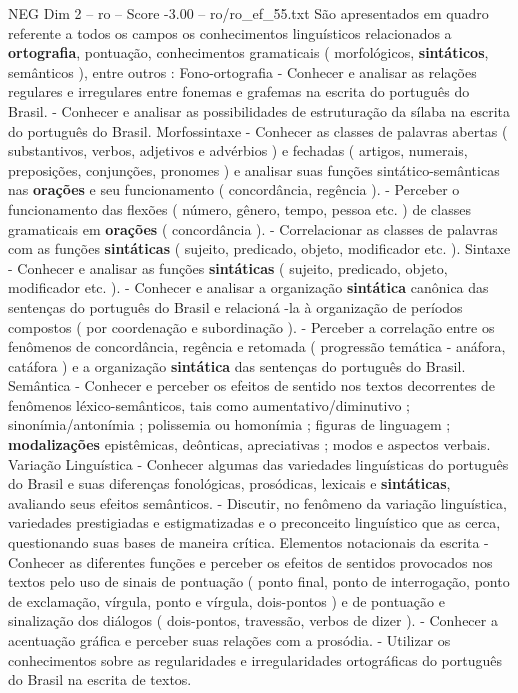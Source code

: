 \begin{textsample}{NEG Dim 2 – ro – Score -3.00 – ro/ro\_ef\_55.txt}
São apresentados em quadro referente a todos os campos os conhecimentos linguísticos relacionados a \textbf{ortografia}, pontuação, conhecimentos gramaticais ( morfológicos, \textbf{sintáticos}, semânticos ), entre outros : Fono-ortografia - Conhecer e analisar as relações regulares e irregulares entre fonemas e grafemas na escrita do português do Brasil. - Conhecer e analisar as possibilidades de estruturação da sílaba na escrita do português do Brasil.
Morfossintaxe - Conhecer as classes de palavras abertas ( substantivos, verbos, adjetivos e advérbios ) e fechadas ( artigos, numerais, preposições, conjunções, pronomes ) e analisar suas funções sintático-semânticas nas \textbf{orações} e seu funcionamento ( concordância, regência ). - Perceber o funcionamento das flexões ( número, gênero, tempo, pessoa etc. ) de classes gramaticais em \textbf{orações} ( concordância ). - Correlacionar as classes de palavras com as funções \textbf{sintáticas} ( sujeito, predicado, objeto, modificador etc. ).
Sintaxe - Conhecer e analisar as funções \textbf{sintáticas} ( sujeito, predicado, objeto, modificador etc. ). - Conhecer e analisar a organização \textbf{sintática} canônica das sentenças do português do Brasil e relacioná -la à organização de períodos compostos ( por coordenação e subordinação ). - Perceber a correlação entre os fenômenos de concordância, regência e retomada ( progressão temática - anáfora, catáfora ) e a organização \textbf{sintática} das sentenças do português do Brasil.
Semântica - Conhecer e perceber os efeitos de sentido nos textos decorrentes de fenômenos léxico-semânticos, tais como aumentativo/diminutivo ; sinonímia/antonímia ; polissemia ou homonímia ; figuras de linguagem ; \textbf{modalizações} epistêmicas, deônticas, apreciativas ; modos e aspectos verbais.
Variação Linguística - Conhecer algumas das variedades linguísticas do português do Brasil e suas diferenças fonológicas, prosódicas, lexicais e \textbf{sintáticas}, avaliando seus efeitos semânticos. - Discutir, no fenômeno da variação linguística, variedades prestigiadas e estigmatizadas e o preconceito linguístico que as cerca, questionando suas bases de maneira crítica.
Elementos notacionais da escrita - Conhecer as diferentes funções e perceber os efeitos de sentidos provocados nos textos pelo uso de sinais de pontuação ( ponto final, ponto de interrogação, ponto de exclamação, vírgula, ponto e vírgula, dois-pontos ) e de pontuação e sinalização dos diálogos ( dois-pontos, travessão, verbos de dizer ). - Conhecer a acentuação gráfica e perceber suas relações com a prosódia. - Utilizar os conhecimentos sobre as regularidades e irregularidades ortográficas do português do Brasil na escrita de textos.

\end{textsample}
